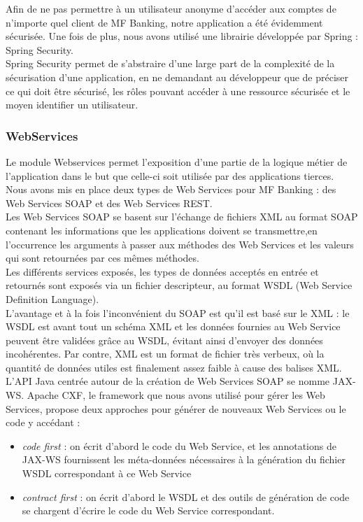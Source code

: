 Afin de ne pas permettre à un utilisateur anonyme d'accéder aux comptes de n'importe quel client de MF Banking, notre application a été évidemment sécurisée. Une fois de plus, nous avons utilisé une librairie développée par Spring : Spring Security.\\
Spring Security permet de s'abstraire d'une large part de la complexité de la sécurisation d'une application, en ne demandant au développeur que de préciser ce qui doit \^etre sécurisé, les rôles pouvant accéder à une ressource sécurisée et le moyen identifier un utilisateur.

\subsubsection*{WebServices} 

Le module Webservices permet l'exposition d'une partie de la logique métier de l'application dans le but que celle-ci soit utilisée par des applications tierces.\\  
Nous avons mis en place deux types de Web Services pour MF Banking : des Web Services SOAP et des Web Services REST.\\

Les Web Services SOAP se basent sur l'échange de fichiers XML au format SOAP contenant les informations que les applications doivent se transmettre,en l'occurrence les arguments à passer aux méthodes des Web Services et les valeurs qui sont retournées par ces mêmes méthodes.\\
Les différents services exposés, les types de données acceptés en entrée et retournés sont exposés via un fichier descripteur, au format WSDL (Web Service Definition Language).\\
L'avantage et à la fois l'inconvénient du SOAP est qu'il est basé sur le XML : le WSDL est avant tout un schéma XML et les données fournies au Web Service peuvent être validées grâce au WSDL, évitant ainsi d'envoyer des données incohérentes. Par contre, XML est un format de fichier très verbeux, où la quantité de données \og utiles \fg{} est finalement assez faible à cause des balises XML. \\
L'API Java centrée autour de la création de Web Services SOAP se nomme JAX-WS.
Apache CXF, le framework que nous avons utilisé pour gérer les Web Services, propose deux approches pour générer de nouveaux Web Services ou le code y accédant :
 
\begin{itemize}
	\item \textit{code first} : on écrit d'abord le code du Web  Service, et les annotations de JAX-WS fournissent les méta-données nécessaires à la génération du fichier WSDL correspondant à ce Web Service
	\item \textit{contract first} : on écrit d'abord le WSDL et des outils de génération de code se chargent d'écrire le code du Web Service correspondant.\\
\end{itemize}

